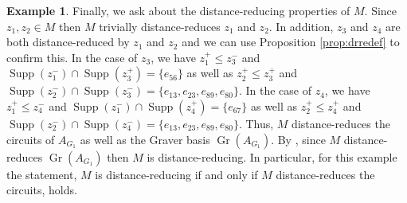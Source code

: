 \documentclass[a4paper, 12pt]{article}
\theoremstyle{plain}
\theoremstyle{definition}
\newtheorem{definition}[theorem]{Definition}
\newtheorem{example}[theorem]{Example}
\theoremstyle{remark}
\begin{document}
\begin{example}
Finally, we ask about the distance-reducing properties of $M$. Since $z_1,z_2 \in M$ then $M$ trivially distance-reduces $z_1$ and $z_2$. In addition, $z_3$ and $z_4$ are both distance-reduced by $z_1$ and $z_2$ and we can use Proposition \ref{prop:drredef} to confirm this. In the case of $z_3$, we have $z_1^+ \le z_3^-$ and $\operatorname{Supp}(z_1^-) \cap \operatorname{Supp}(z_3^+)=\{e_{56}\}$ as well as $z_2^+ \le z_3^+$ and $\operatorname{Supp}(z_2^-)\cap \operatorname{Supp}(z_3^-)=\{e_{13},e_{23},e_{89},e_{80}\}$. In the case of $z_4$, we have $z_1^+ \le z_4^-$ and $\operatorname{Supp}(z_1^-) \cap \operatorname{Supp}(z_4^+)=\{e_{67}\}$ as well as $z_2^+ \le z_4^+$ and $\operatorname{Supp}(z_2^-) \cap \operatorname{Supp}(z_4^-)=\{e_{13},e_{23},e_{89},e_{80}\}$. Thus, $M$ distance-reduces the circuits of $A_{G_1}$ as well as the Graver basis $\operatorname{Gr}(A_{G_1})$. By \cite[Theorem 7.4]{CK_2024}, since $M$ distance-reduces $\operatorname{Gr}(A_{G_1})$ then $M$ is distance-reducing. In particular, for this example the statement, $M$ is distance-reducing if and only if $M$ distance-reduces the circuits, holds.
\end{example}






\end{document}
